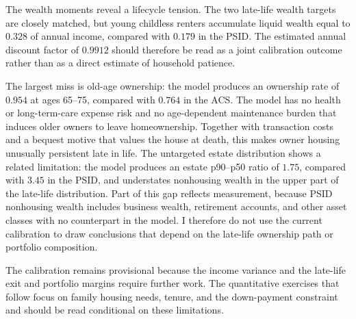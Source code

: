 The wealth moments reveal a lifecycle tension. The two late-life wealth targets
are closely matched, but young childless renters accumulate liquid wealth equal
to $0.328$ of annual income, compared with $0.179$ in the PSID. The estimated
annual discount factor of $0.9912$ should therefore be read as a joint
calibration outcome rather than as a direct estimate of household patience.

The largest miss is old-age ownership: the model produces an ownership rate of
$0.954$ at ages 65--75, compared with $0.764$ in the ACS. The model has no
health or long-term-care expense risk and no age-dependent maintenance burden
that induces older owners to leave homeownership. Together with transaction
costs and a bequest motive that values the house at death, this makes owner
housing unusually persistent late in life. The untargeted estate distribution
shows a related limitation: the model produces an estate p90--p50 ratio of
$1.75$, compared with $3.45$ in the PSID, and understates nonhousing wealth in
the upper part of the late-life distribution. Part of this gap reflects
measurement, because PSID nonhousing wealth includes business wealth,
retirement accounts, and other asset classes with no counterpart in the
model. I therefore do not use the
current calibration to draw conclusions that depend on the late-life ownership
path or portfolio composition.

The calibration remains provisional because the income variance and the
late-life exit and portfolio margins require further work. The quantitative
exercises that follow focus on family housing needs, tenure, and the
down-payment constraint and should be read conditional on these limitations.
